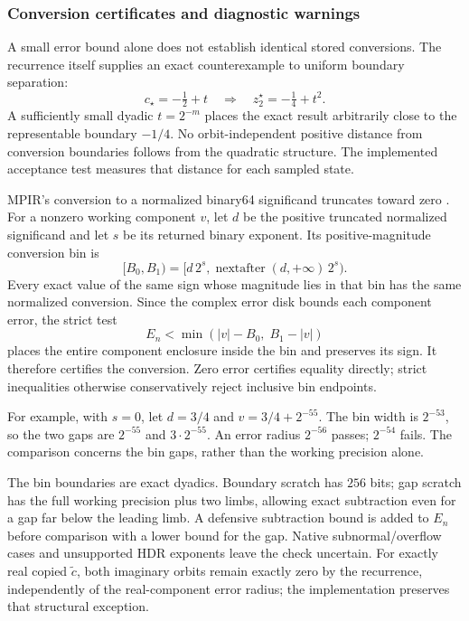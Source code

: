 \subsubsection{Conversion certificates and diagnostic warnings}
\label{subsec:ref-orbit-dynamic-certificate}

A small error bound alone does not establish identical stored conversions.
The recurrence itself supplies an exact counterexample to uniform boundary
separation:
\begin{equation}
 c_\star=-\tfrac12+t
 \quad\Longrightarrow\quad
 z_2^\star=-\tfrac14+t^2.
 \label{eq:dynamic-boundary-example}
\end{equation}
A sufficiently small dyadic $t=2^{-m}$ places the exact result arbitrarily
close to the representable boundary $-1/4$. No orbit-independent positive
distance from conversion boundaries follows from the quadratic structure.
The implemented acceptance test measures that distance for each sampled state.

MPIR's conversion to a normalized binary64 significand truncates toward zero
\cite{GMPFloatManual}. For a nonzero working component $v$, let $d$ be the
positive truncated normalized significand and let $s$ be its returned binary
exponent. Its positive-magnitude conversion bin is
\begin{equation}
 [B_0,B_1)=
 [d\,2^s,\operatorname{nextafter}(d,+\infty)\,2^s).
 \label{eq:dynamic-conversion-bin}
\end{equation}
Every exact value of the same sign whose magnitude lies in that bin has the
same normalized conversion. Since the complex error disk bounds each
component error, the strict test
\begin{equation}
 E_n<\min(|v|-B_0,\;B_1-|v|)
 \label{eq:dynamic-conversion-test}
\end{equation}
places the entire component enclosure inside the bin and preserves its sign.
It therefore certifies the conversion. Zero error certifies equality directly;
strict inequalities otherwise conservatively reject inclusive bin endpoints.

For example, with $s=0$, let $d=3/4$ and $v=3/4+2^{-55}$. The bin width is
$2^{-53}$, so the two gaps are $2^{-55}$ and $3\cdot2^{-55}$.
An error radius $2^{-56}$ passes; $2^{-54}$ fails. The comparison concerns
the bin gaps, rather than the working precision alone.

The bin boundaries are exact dyadics. Boundary scratch has $256$ bits;
gap scratch has the full working precision plus two limbs, allowing exact
subtraction even for a gap far below the leading limb. A defensive subtraction
bound is added to $E_n$ before comparison with a lower bound for the gap.
Native subnormal/overflow cases and unsupported HDR exponents leave the
check uncertain. For exactly real copied $\widetilde c$, both imaginary orbits
remain exactly zero by the recurrence, independently of the real-component error radius;
the implementation preserves that structural exception.

